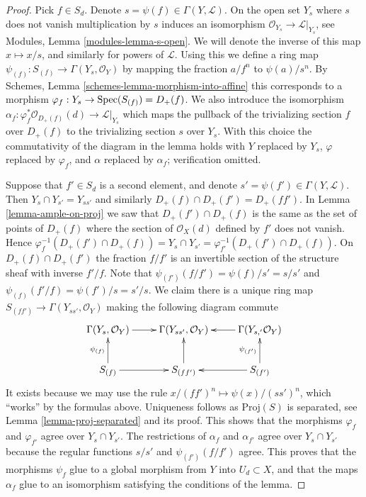 \begin{proof}
Pick $f \in S_d$. Denote $s = \psi(f) \in \Gamma(Y, \mathcal{L})$.
On the open set $Y_s$ where $s$ does not vanish multiplication
by $s$ induces an isomorphism $\mathcal{O}_{Y_s} \to \mathcal{L}|_{Y_s}$,
see Modules, Lemma \ref{modules-lemma-s-open}. We will denote
the inverse of this map $x \mapsto x/s$, and similarly for
powers of $\mathcal{L}$. Using this we
define a ring map $\psi_{(f)} : S_{(f)} \to \Gamma(Y_s, \mathcal{O}_Y)$
by mapping the fraction $a/f^n$ to $\psi(a)/s^n$.
By Schemes, Lemma \ref{schemes-lemma-morphism-into-affine}
this corresponds to a morphism
$\varphi_f : Y_s \to \mathop{\mathrm{Spec}}(S_{(f)}) = D_{+}(f)$.
We also introduce the isomorphism
$\alpha_f : \varphi_f^*\mathcal{O}_{D_{+}(f)}(d) \to \mathcal{L}|_{Y_s}$
which maps the pullback of the trivializing section
$f$ over $D_{+}(f)$ to the trivializing section $s$ over $Y_s$.
With this choice the commutativity of the diagram in the lemma
holds with $Y$ replaced by $Y_s$, $\varphi$ replaced by $\varphi_f$,
and $\alpha$ replaced by $\alpha_f$; verification omitted.

\medskip\noindent
Suppose that $f' \in S_d$ is a second element, and denote
$s' = \psi(f') \in \Gamma(Y, \mathcal{L})$. Then
$Y_s \cap Y_{s'} = Y_{ss'}$ and similarly
$D_{+}(f) \cap D_{+}(f') = D_{+}(ff')$.
In Lemma \ref{lemma-ample-on-proj} we saw that
$D_{+}(f') \cap D_{+}(f)$ is the same as the set
of points of $D_{+}(f)$ where the section of
$\mathcal{O}_X(d)$ defined by $f'$ does not vanish.
Hence
$\varphi_f^{-1}(D_{+}(f') \cap D_{+}(f)) = Y_s \cap Y_{s'}
= \varphi_{f'}^{-1}(D_{+}(f') \cap D_{+}(f))$.
On $D_{+}(f) \cap D_{+}(f')$ the fraction $f/f'$ is an
invertible section of the structure sheaf with inverse
$f'/f$. Note that $\psi_{(f')}(f/f') = \psi(f)/s' = s/s'$
and $\psi_{(f)}(f'/f) = \psi(f')/s = s'/s$. We claim there
is a unique ring map
$S_{(ff')} \to \Gamma(Y_{ss'}, \mathcal{O}_Y)$ making the
following diagram commute
$$
\xymatrix{
\Gamma(Y_s, \mathcal{O}_Y) \ar[r] &
\Gamma(Y_{ss'}, \mathcal{O}_Y) &
\Gamma(Y_{s, '} \mathcal{O}_Y) \ar[l]\\
S_{(f)} \ar[r] \ar[u]^{\psi_{(f)}} &
S_{(ff')} \ar[u] &
S_{(f')} \ar[l] \ar[u]^{\psi_{(f')}}
}
$$
It exists because we may use the rule
$x/(ff')^n \mapsto \psi(x)/(ss')^n$, which ``works'' by the formulas
above. Uniqueness follows as $\text{Proj}(S)$ is separated, see
Lemma \ref{lemma-proj-separated} and its proof. This shows that the
morphisms $\varphi_f$ and $\varphi_{f'}$ agree over $Y_s \cap Y_{s'}$.
The restrictions of $\alpha_f$ and $\alpha_{f'}$ agree over
$Y_s \cap Y_{s'}$ because the regular functions $s/s'$ and
$\psi_{(f')}(f/f')$ agree. This proves that the morphisms $\psi_f$
glue to a global morphism from $Y$ into $U_d \subset X$, and
that the maps $\alpha_f$ glue to an isomorphism satisfying the
conditions of the lemma.


\end{proof}
